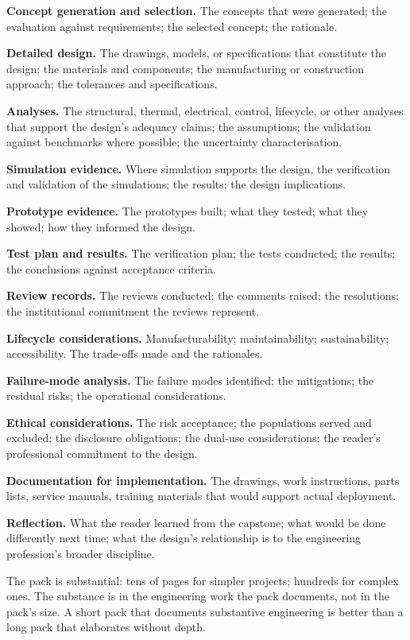 \textbf{Concept generation and selection.} The concepts that were generated; the evaluation against requirements; the selected concept; the rationale.

\textbf{Detailed design.} The drawings, models, or specifications that constitute the design; the materials and components; the manufacturing or construction approach; the tolerances and specifications.

\textbf{Analyses.} The structural, thermal, electrical, control, lifecycle, or other analyses that support the design's adequacy claims; the assumptions; the validation against benchmarks where possible; the uncertainty characterisation.

\textbf{Simulation evidence.} Where simulation supports the design, the verification and validation of the simulations; the results; the design implications.

\textbf{Prototype evidence.} The prototypes built; what they tested; what they showed; how they informed the design.

\textbf{Test plan and results.} The verification plan; the tests conducted; the results; the conclusions against acceptance criteria.

\textbf{Review records.} The reviews conducted; the comments raised; the resolutions; the institutional commitment the reviews represent.

\textbf{Lifecycle considerations.} Manufacturability; maintainability; sustainability; accessibility. The trade-offs made and the rationales.

\textbf{Failure-mode analysis.} The failure modes identified; the mitigations; the residual risks; the operational considerations.

\textbf{Ethical considerations.} The risk acceptance; the populations served and excluded; the disclosure obligations; the dual-use considerations; the reader's professional commitment to the design.

\textbf{Documentation for implementation.} The drawings, work instructions, parts lists, service manuals, training materials that would support actual deployment.

\textbf{Reflection.} What the reader learned from the capstone; what would be done differently next time; what the design's relationship is to the engineering profession's broader discipline.

The pack is substantial: tens of pages for simpler projects; hundreds for complex ones. The substance is in the engineering work the pack documents, not in the pack's size. A short pack that documents substantive engineering is better than a long pack that elaborates without depth.

